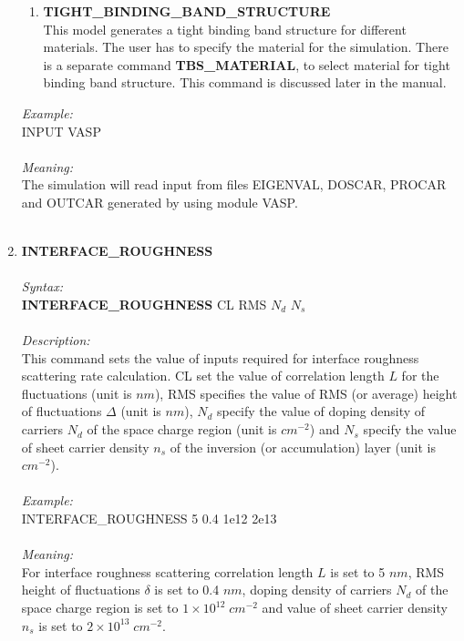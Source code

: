 \documentclass[12pt]{article}
\begin{document}
\begin{enumerate}
\begin{enumerate}
        \item \textbf{TIGHT\_BINDING\_BAND\_STRUCTURE} \\
        This model generates a tight binding band structure for different materials. The user has to specify the material for the simulation. There is a separate command \textbf{TBS\_MATERIAL}, to select material for tight binding band structure. This command is discussed later in the manual. 
    \end{enumerate}
    
    \textit{Example:} \\ 
    INPUT VASP \\ \\
    \textit{Meaning:} \\    
    The simulation will read input from files EIGENVAL, DOSCAR, PROCAR and OUTCAR generated by using module VASP. \\ \\

    \item \textbf{INTERFACE\_ROUGHNESS}  \\ \\
    \textit{Syntax:} \\
    \textbf{INTERFACE\_ROUGHNESS} CL RMS $N_d$ $N_s$ \\ \\
    \textit{Description:} \\
    This command sets the value of inputs required for interface roughness scattering rate calculation. CL set the value of correlation length $L$ for the fluctuations (unit is $nm$), RMS specifies the value of RMS (or average) height of fluctuations $\Delta$ (unit is $nm$), $N_d$ specify the value of doping density of carriers $N_d$ of the space charge region (unit is $cm^{-2}$) and $N_s$ specify the value of sheet carrier density $n_s$ of the inversion (or accumulation) layer (unit is $cm^{-2}$). \\ \\  
    \textit{Example:} \\
    INTERFACE\_ROUGHNESS 5 0.4 1e12 2e13 \\ \\
    \textit{Meaning:} \\    
    For interface roughness scattering correlation length $L$ is set to 5 $nm$, RMS height of fluctuations $\delta$ is set to 0.4 $nm$, doping density of carriers $N_d$ of the space charge region is set to $1 \times 10^{12} \; cm^{-2}$ and value of sheet carrier density $n_s$ is set to $2 \times 10^{13} \; cm^{-2}$. \\ \\


\end{enumerate}
\end{document}
